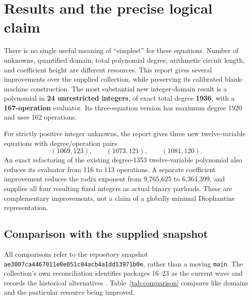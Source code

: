 \documentclass[11pt,letterpaper]{article}
\theoremstyle{remark}
\begin{document}
\section{Results and the precise logical claim}
\label{sec:results}

There is no single useful meaning of ``simplest'' for these equations.
Number of unknowns, quantified domain, total polynomial degree, arithmetic
circuit length, and coefficient height are different resources.  This report
gives several improvements over the supplied collection, while preserving
its calibrated blank-machine construction.  The most substantial new
integer-domain result is a polynomial in \textbf{24 unrestricted integers},
of exact total degree \textbf{1936}, with a \textbf{167-operation} evaluator.
Its three-equation version has maximum degree 1920 and uses 162 operations.

For strictly positive integer unknowns, the report gives three new
twelve-variable equations with degree/operation pairs
\[
 (1069,123),\qquad (1073,121),\qquad (1081,120).
\]
An exact refactoring of the existing degree-1353 twelve-variable polynomial
also reduces its evaluator from 116 to 113 operations.  A separate
coefficient improvement reduces the radix exponent from 9,765,625 to
6,364,399, and supplies all four resulting fixed integers as actual binary
payloads.  These are complementary improvements, not a claim of a globally
minimal Diophantine representation.

\subsection{Comparison with the supplied snapshot}

All comparisons refer to the repository snapshot
\texttt{ae3007ca4467011e0e051c84acb4a1dd13971b0e}, rather than a moving
\texttt{main}.  The collection's own reconciliation identifies packages
16--23 as the current wave and records the historical alternatives
\cite{collection}.  Table~\ref{tab:comparison} compares like domains and
the particular resource being improved.
\end{document}
